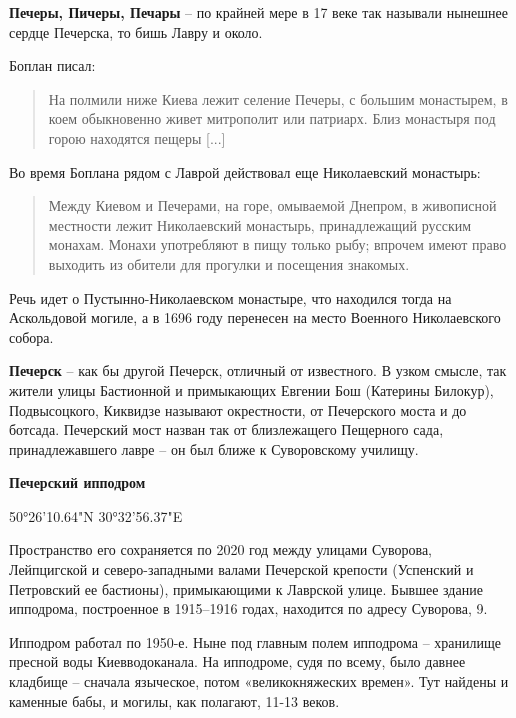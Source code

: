 \medskip



\textbf{Печеры, Пичеры, Печары} – по крайней мере в 17 веке так называли нынешнее сердце Печерска, то бишь Лавру и около.

Боплан писал:

\begin{quotation}На полмили ниже Киева лежит селение Печеры, с большим монастырем, в коем обыкновенно живет митрополит или патриарх. Близ монастыря под горою находятся пещеры [...]
\end{quotation}

Во время Боплана рядом с Лаврой действовал еще Николаевский монастырь:

\begin{quotation}
Между Киевом и Печерами, на горе, омываемой Днепром, в живописной местности лежит Николаевский монастырь, принадлежащий русским монахам. Монахи употребляют в пищу только рыбу; впрочем имеют право выходить из обители для прогулки и посещения знакомых.
\end{quotation}

Речь идет о Пустынно-Николаевском монастыре, что находился тогда на Аскольдовой могиле, а в 1696 году перенесен на место Военного Николаевского собора.\\

\medskip

\textbf{Печерск} – как бы другой Печерск, отличный от известного. В узком смысле, так жители улицы Бастионной и примыкающих Евгении Бош (Катерины Билокур), Подвысоцкого, Киквидзе называют окрестности, от Печерского моста и до ботсада. Печерский мост назван так от близлежащего Пещерного сада, принадлежавшего лавре – он был ближе к Суворовскому училищу.\\ 

\medskip

\textbf{Печерский ипподром}

50°26'10.64"N 30°32'56.37"E

Пространство его сохраняется по 2020 год между улицами Суворова, Лейпцигской и сев\-еро-западными валами Печерской крепости (Успенский и Петровский ее бастионы), примыкающими к Лаврской улице. Бывшее здание ипподрома, построенное в 1915–1916 годах, находится по адресу Суворова, 9.

Ипподром работал по 1950-е. Ныне под главным полем ипподрома – хранилище пресной воды Киевводоканала. На ипподроме, судя по всему, было давнее кладбище – сначала языческое, потом «великокняжеских времен». Тут найдены и каменные бабы, и могилы, как полагают, 11-13 веков.

